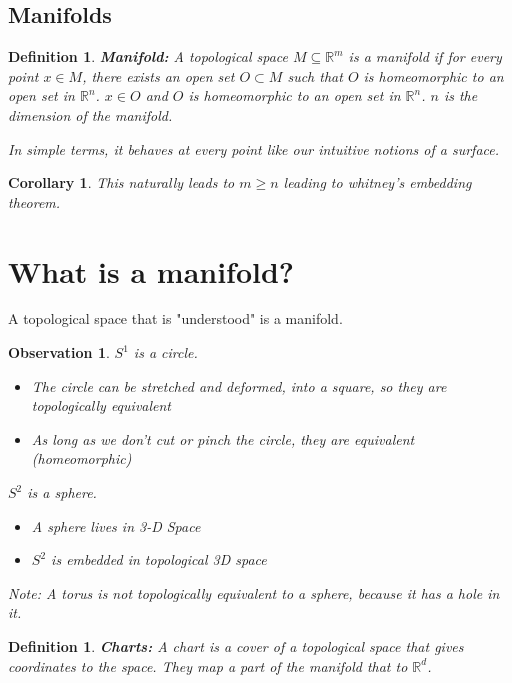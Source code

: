 \documentclass[11pt]{article}
\newtheorem{corollary}[theorem]{Corollary}
\newtheorem{observation}[theorem]{Observation}
\newtheorem{definition}[theorem]{Definition}
\begin{document}
\subsection{Manifolds}

\begin{definition}
  \textbf{Manifold:} A topological space $M \subseteq \mathbb{R}^m$ is a manifold if for 
  every point $x \in M$, there exists an open set $O \subset M$ such that $O$ is homeomorphic to an open set in $\mathbb{R}^n$.
   $x \in O$ and $O$ is homeomorphic to an open set in $\mathbb{R}^n$. $n$ is the dimension of the manifold.

  In simple terms, it behaves at every point like our intuitive notions of a surface.
\end{definition}

\begin{corollary}
  This naturally leads to $m \geq n$ leading to whitney's embedding theorem. 
\end{corollary}

\section{What is a manifold?}

A topological space that is "understood" is a manifold. 
\begin{observation}
  $S^1$ is a circle.
  \begin{itemize}
    \item The circle can be stretched and deformed, into a square, so they are topologically equivalent
    \item As long as we don't cut or pinch the circle, they are equivalent (homeomorphic)
  \end{itemize}
  $S^2$ is a sphere.
  \begin{itemize}
    \item A sphere lives in 3-D Space
    \item $S^2$ is embedded in topological 3D space
  \end{itemize}

  Note: A torus is not topologically equivalent to a sphere, because it has a hole in it.
\end{observation}

\begin{definition}
  \textbf{Charts:} A chart is a cover of a topological space that gives coordinates to the space.
  They map a part of the manifold that to $\mathbb{R}^d$.
\end{definition}
\end{document}
